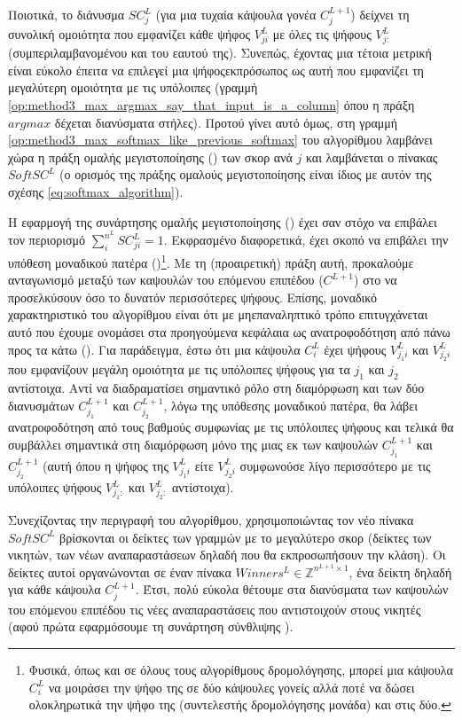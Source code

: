 Ποιοτικά, το διάνυσμα $SC^L_j$ (για μια τυχαία κάψουλα γονέα $C_j^{L+1}$) δείχνει τη συνολική ομοιότητα που εμφανίζει κάθε ψήφος $V_{ji}^L$ με όλες τις ψήφους $V_{j:}^L$ (συμπεριλαμβανομένου και του εαυτού της). Συνεπώς, έχοντας μια τέτοια μετρική είναι εύκολο έπειτα να επιλεγεί μια ψήφος\textendash εκπρόσωπος ως αυτή που εμφανίζει τη μεγαλύτερη ομοιότητα με τις υπόλοιπες (γραμμή \ref{op:method3_max_argmax_say_that_input_is_a_column} όπου η πράξη $argmax$ δέχεται διανύσματα στήλες). Προτού γίνει αυτό όμως, στη γραμμή \ref{op:method3_max_softmax_like_previous_softmax} του αλγορίθμου λαμβάνει χώρα η πράξη ομαλής μεγιστοποίησης () των σκορ ανά $j$ και λαμβάνεται ο πίνακας $SoftSC^L$ (ο ορισμός της πράξης ομαλούς μεγιστοποίησης είναι ίδιος με αυτόν της σχέσης \ref{eq:softmax_algorithm}).\par

Η εφαρμογή της συνάρτησης ομαλής μεγιστοποίησης () έχει σαν στόχο να επιβάλει τον περιορισμό $\sum_i^{n^L} SC_{ji}^L = 1$. Εκφρασμένο διαφορετικά, έχει σκοπό να επιβάλει την υπόθεση μοναδικού πατέρα ()\footnote{Φυσικά, όπως και σε όλους τους αλγορίθμους δρομολόγησης, μπορεί μια κάψουλα $C_i^L$ να μοιράσει την ψήφο της σε δύο κάψουλες γονείς αλλά ποτέ να δώσει ολοκληρωτικά την ψήφο της (συντελεστής δρομολόγησης μονάδα) και στις δύο.}. Με τη (προαιρετική) πράξη αυτή, προκαλούμε ανταγωνισμό μεταξύ των καψουλών του επόμενου επιπέδου ($C^{L+1}$) στο να προσελκύσουν όσο το δυνατόν περισσότερες ψήφους. Επίσης, μοναδικό χαρακτηριστικό του αλγορίθμου είναι ότι με μη\textendash επαναληπτικό τρόπο επιτυγχάνεται αυτό που έχουμε ονομάσει στα προηγούμενα κεφάλαια ως ανατροφοδότηση από πάνω προς τα κάτω (). Για παράδειγμα, έστω ότι μια κάψουλα $C_i^L$ έχει ψήφους $V_{j_1i}^L$ και $V_{j_2i}^L$ που εμφανίζουν μεγάλη ομοιότητα με τις υπόλοιπες ψήφους για τα $j_1$ και $j_2$ αντίστοιχα. Αντί να διαδραματίσει σημαντικό ρόλο στη διαμόρφωση και των δύο διανυσμάτων $C_{j_1}^{L+1}$ και $C_{j_2}^{L+1}$, λόγω της υπόθεσης μοναδικού πατέρα, θα λάβει ανατροφοδότηση από τους βαθμούς συμφωνίας με τις υπόλοιπες ψήφους και τελικά θα συμβάλλει σημαντικά στη διαμόρφωση μόνο της μιας εκ των καψουλών $C_{j_1}^{L+1}$ και $C_{j_2}^{L+1}$ (αυτή όπου η ψήφος της $V_{j_1i}^L$ είτε $V_{j_2i}^L$ συμφωνούσε λίγο περισσότερο με τις υπόλοιπες ψήφους $V_{j_1:}^L$ και $V_{j_2:}^L$ αντίστοιχα).\par

Συνεχίζοντας την περιγραφή του αλγορίθμου, χρησιμοποιώντας τον νέο πίνακα $ SoftSC^L $ βρίσκονται οι δείκτες των γραμμών με το μεγαλύτερο σκορ (δείκτες των νικητών, των νέων αναπαραστάσεων δηλαδή που θα εκπροσωπήσουν την κλάση). Οι δείκτες αυτοί οργανώνονται σε έναν πίνακα $ Winners^L \in \mathbb{Z}^{n^{L+1}\times 1} $, ένα δείκτη δηλαδή για κάθε κάψουλα $C_j^{L+1}$. Έτσι, πολύ εύκολα θέτουμε στα διανύσματα των καψουλών του επόμενου επιπέδου τις νέες αναπαραστάσεις που αντιστοιχούν στους νικητές (αφού πρώτα εφαρμόσουμε τη συνάρτηση σύνθλιψης ).\par

